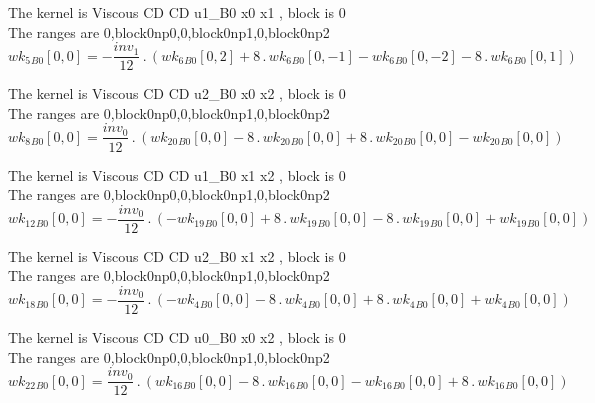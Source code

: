 \documentclass{article}
\begin{document}
\noindent The kernel is Viscous CD CD u1_B0 x0 x1 , block is 0\\\noindent The ranges are 0,block0np0,0,block0np1,0,block0np2\\\begin{dmath}{wk_{5}{_{B0}}}[{0,0}] = - \frac{inv_1}{12} \,.\, \left({wk_{6}{_{B0}}}[{0,2}] + 8 \,.\, {wk_{6}{_{B0}}}[{0,-1}] - {wk_{6}{_{B0}}}[{0,-2}] - 8 \,.\, {wk_{6}{_{B0}}}[{0,1}]\right)\end{dmath}

\noindent The kernel is Viscous CD CD u2_B0 x0 x2 , block is 0\\\noindent The ranges are 0,block0np0,0,block0np1,0,block0np2\\\begin{dmath}{wk_{8}{_{B0}}}[{0,0}] = \frac{inv_0}{12} \,.\, \left({wk_{20}{_{B0}}}[{0,0}] - 8 \,.\, {wk_{20}{_{B0}}}[{0,0}] + 8 \,.\, {wk_{20}{_{B0}}}[{0,0}] - {wk_{20}{_{B0}}}[{0,0}]\right)\end{dmath}

\noindent The kernel is Viscous CD CD u1_B0 x1 x2 , block is 0\\\noindent The ranges are 0,block0np0,0,block0np1,0,block0np2\\\begin{dmath}{wk_{12}{_{B0}}}[{0,0}] = - \frac{inv_0}{12} \,.\, \left(- {wk_{19}{_{B0}}}[{0,0}] + 8 \,.\, {wk_{19}{_{B0}}}[{0,0}] - 8 \,.\, {wk_{19}{_{B0}}}[{0,0}] + {wk_{19}{_{B0}}}[{0,0}]\right)\end{dmath}

\noindent The kernel is Viscous CD CD u2_B0 x1 x2 , block is 0\\\noindent The ranges are 0,block0np0,0,block0np1,0,block0np2\\\begin{dmath}{wk_{18}{_{B0}}}[{0,0}] = - \frac{inv_0}{12} \,.\, \left(- {wk_{4}{_{B0}}}[{0,0}] - 8 \,.\, {wk_{4}{_{B0}}}[{0,0}] + 8 \,.\, {wk_{4}{_{B0}}}[{0,0}] + {wk_{4}{_{B0}}}[{0,0}]\right)\end{dmath}

\noindent The kernel is Viscous CD CD u0_B0 x0 x2 , block is 0\\\noindent The ranges are 0,block0np0,0,block0np1,0,block0np2\\\begin{dmath}{wk_{22}{_{B0}}}[{0,0}] = \frac{inv_0}{12} \,.\, \left({wk_{16}{_{B0}}}[{0,0}] - 8 \,.\, {wk_{16}{_{B0}}}[{0,0}] - {wk_{16}{_{B0}}}[{0,0}] + 8 \,.\, {wk_{16}{_{B0}}}[{0,0}]\right)\end{dmath}
\end{document}
